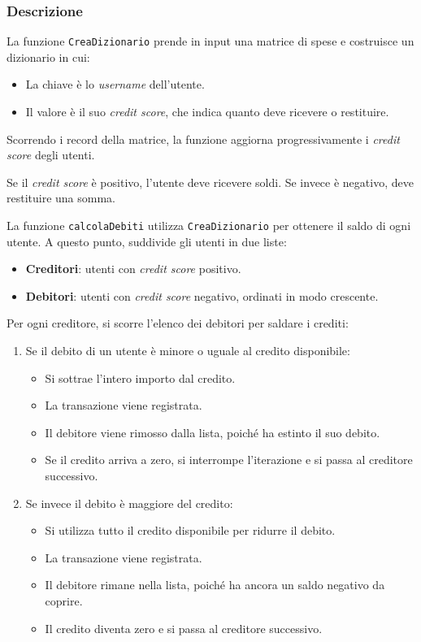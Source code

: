 \subsubsection{Descrizione}

La funzione \texttt{CreaDizionario} prende in input una matrice di spese e costruisce un dizionario in cui:

\begin{itemize}
    \item La chiave è lo \textit{username} dell’utente.
    \item Il valore è il suo \textit{credit score}, che indica quanto deve ricevere o restituire.
\end{itemize}

Scorrendo i record della matrice, la funzione aggiorna progressivamente i \textit{credit score} degli utenti.


Se il \textit{credit score} è positivo, l’utente deve ricevere soldi.
Se invece è negativo, deve restituire una somma.


La funzione \texttt{calcolaDebiti} utilizza \texttt{CreaDizionario} per ottenere il saldo di ogni utente.
A questo punto, suddivide gli utenti in due liste:

\begin{itemize}
    \item \textbf{Creditori}: utenti con \textit{credit score} positivo.
    \item \textbf{Debitori}: utenti con \textit{credit score} negativo, ordinati in modo crescente.
\end{itemize}

Per ogni creditore, si scorre l’elenco dei debitori per saldare i crediti:

\begin{enumerate}
    \item Se il debito di un utente è minore o uguale al credito disponibile:
    \begin{itemize}
        \item Si sottrae l’intero importo dal credito.
        \item La transazione viene registrata.
        \item Il debitore viene rimosso dalla lista, poiché ha estinto il suo debito.
        \item Se il credito arriva a zero, si interrompe l’iterazione e si passa al creditore successivo.
    \end{itemize}
    \item Se invece il debito è maggiore del credito:
    \begin{itemize}
        \item Si utilizza tutto il credito disponibile per ridurre il debito.
        \item La transazione viene registrata.
        \item Il debitore rimane nella lista, poiché ha ancora un saldo negativo da coprire.
        \item Il credito diventa zero e si passa al creditore successivo.
    \end{itemize}
\end{enumerate}


